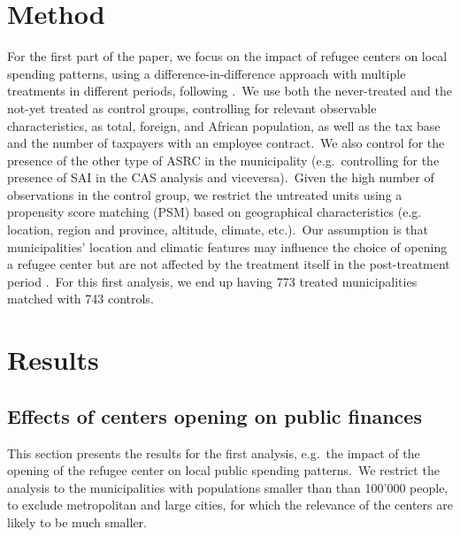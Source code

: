 \documentclass[authoryear,preprint,review,12pt]{elsarticle}
\begin{document}
\section*{Method}

\noindent
For the first part of the paper, we focus on the impact of refugee centers on local spending patterns, using a difference-in-difference approach with multiple treatments in different periods, following \cite{clarke2020}.\ We use both the never-treated and the not-yet treated as control groups, controlling for relevant observable characteristics, as total, foreign, and African population, as well as the tax base and the number of taxpayers with an employee contract.\ We also control for the presence of the other type of ASRC in the municipality (e.g.\ controlling for the presence of SAI in the CAS analysis and viceversa).\ Given the high number of observations in the control group, we restrict the untreated units using a propensity score matching (PSM) \citep{rubin1985} based on geographical characteristics (e.g. location, region and province, altitude, climate, etc.).\ Our assumption is that municipalities' location and climatic features may influence the choice of opening a refugee center but are not affected by the treatment itself in the post-treatment period \citep{Austin2011AnStudies}.\ For this first analysis, we end up having 773 treated municipalities matched with 743 controls.\\ 




\section*{Results}

\subsection*{Effects of centers opening on public finances}
\normalsize

\noindent
This section presents the results for the first analysis, e.g.\ the impact of the opening of the refugee center on local public spending patterns.\ We restrict the analysis to the municipalities with populations smaller than than 100'000 people, to exclude metropolitan and large cities, for which the relevance of the centers are likely to be much smaller.\\
\end{document}
